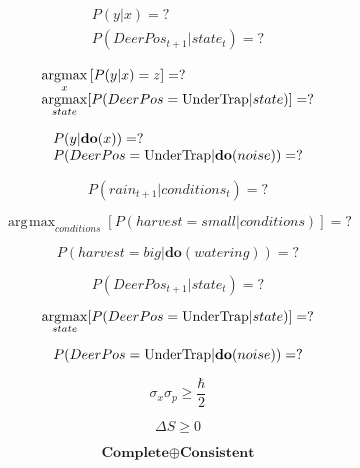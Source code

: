 \documentclass[12pt,letterpaper]{article}
\DeclareMathOperator*{\argmax}{\arg\!\max}
\begin{document}
{\Large
\[ 
\begin{array}{l}
P(y|x) = ?\\
P(DeerPos_{t+1} | state_t) = ?
\end{array}
\]
%

\[ 
\begin{array}{l}
\displaystyle\argmax_x \left[ P(y|x)=z \right] = ?\\
\displaystyle\argmax_{state} [P(DeerPos=\textnormal{UnderTrap} | state)] = ?
\end{array}
\]

\[ 
\begin{array}{l}
P(y|\mathbf{do}(x)) = ?\\
P(DeerPos=\textnormal{UnderTrap} | \textbf{do}(noise)) = ?
\end{array}
\]

\[
P(rain_{t+1} | conditions_t) = ?
\]


\[
\argmax_{conditions} [P(harvest=small | conditions)] = ?
\]

\[
P(harvest=big | \textbf{do}(watering)) = ?
\]


\[
P(DeerPos_{t+1} | state_t) = ?
\]


\[
\argmax_{state} [P(DeerPos=\textnormal{UnderTrap} | state)] = ?
\]

\[
P(DeerPos=\textnormal{UnderTrap} | \textbf{do}(noise)) = ?
\]

\[
\sigma_x \sigma_p \geq \frac{\hbar}{2}
\]

\[
\Delta S \geq 0
\]

\[
\textbf{Complete} \oplus \textbf{Consistent}
\]

}
\end{document}
